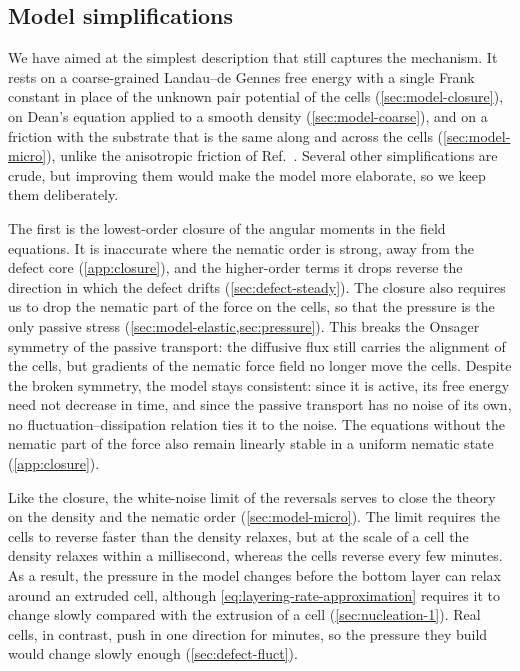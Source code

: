 \documentclass[aps,pre,reprint,superscriptaddress,longbibliography,nofootinbib
]{revtex4-2}
\begin{document}
\subsection{Model simplifications}
\label{sec:model-assumptions}

We have aimed at the simplest description that still
captures the mechanism. It rests on a coarse-grained
Landau--de Gennes free energy with a single Frank constant
in place of the unknown pair potential of the cells
(\cref{sec:model-closure}), on Dean's equation applied to a
smooth density (\cref{sec:model-coarse}), and on a friction
with the substrate that is the same along and across the
cells (\cref{sec:model-micro}), unlike the anisotropic
friction of Ref.~\cite{copenhagen2021}. Several other
simplifications are crude, but improving them would make
the model more elaborate, so we keep them deliberately.

The first is the lowest-order closure of the angular
moments in the field equations. It is inaccurate where the
nematic order is strong, away from the defect core
(\cref{app:closure}), and the higher-order terms it drops
reverse the direction in which the defect drifts
(\cref{sec:defect-steady}). The closure also requires
us to drop the nematic part of the force on the cells, so
that the pressure is the only passive stress
(\cref{sec:model-elastic,sec:pressure}). This breaks the
Onsager symmetry of the passive transport: the
diffusive flux still carries the alignment of the cells,
but gradients of the nematic force field no longer move the
cells. Despite the broken symmetry, the model stays
consistent: since it is active, its free energy need
not decrease in time, and since the passive transport has
no noise of its own, no fluctuation--dissipation relation
ties it to the noise. The equations without the nematic
part of the force also remain linearly stable in a uniform
nematic state (\cref{app:closure}).

Like the closure, the white-noise limit of the reversals
serves to close the theory on the density and the nematic
order (\cref{sec:model-micro}). The limit requires the
cells to reverse faster than the density relaxes, but at
the scale of a cell the density relaxes within a
millisecond, whereas the cells reverse every few minutes.
As a result, the pressure in the model changes before the
bottom layer can relax around an extruded cell, although
\cref{eq:layering-rate-approximation} requires it to change
slowly compared with the extrusion of a cell
(\cref{sec:nucleation-1}). Real cells, in contrast, push in
one direction for minutes, so the pressure they build would
change slowly enough (\cref{sec:defect-fluct}).
\end{document}
